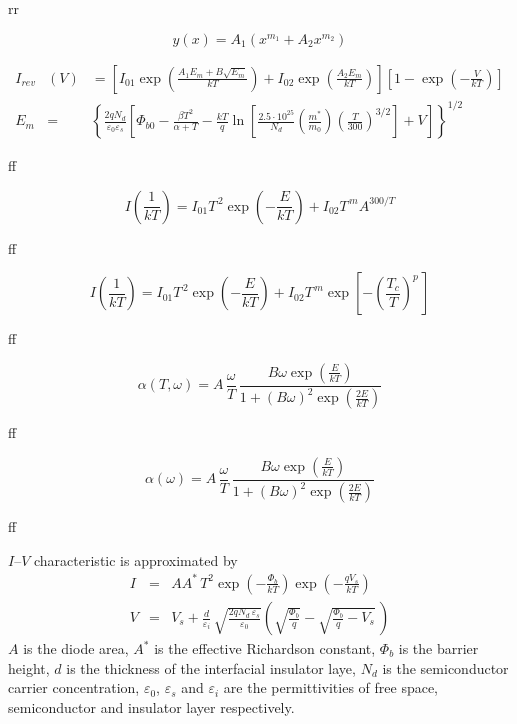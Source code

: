 \documentclass[14pt]{article}
\numberwithin{equation}{part}
\begin{document}
rr


\begin{equation*}
    y(x)=A_1\left(x^{m_1}+A_2x^{m_2}\right)
\end{equation*}

\begin{eqnarray*}
    I_{rev}&(V)&=\left[I_{01}\exp\left(\frac{A_1E_m+B\sqrt{E_m}}{kT}\right)+I_{02}\exp\left(\frac{A_2E_m}{kT}\right)\right]
    \left[1-\exp\left(-\frac{V}{kT}\right)\right] \\
    E_m&=&\left\{\frac{2qN_d}{\varepsilon_0\varepsilon_s}\left[\Phi_{b0}-\frac{\beta T^2}{\alpha+T}-\frac{kT}{q}\ln\left[\frac{2.5\cdot10^{25}}{N_d}\left(\frac{m^*}{m_0}\right)
     \left(\frac{T}{300}\right)^{3/2}\right]+V\right]\right\}^{1/2}
\end{eqnarray*}

ff

\begin{equation*}
    I\left(\frac{1}{kT}\right)=I_{01}T^{\,2}\exp\left(-\frac{E}{kT}\right)+
       I_{02}T^{\,m}A^{300/T}
\end{equation*}

ff

\begin{equation*}
    I\left(\frac{1}{kT}\right)=I_{01}T^{\,2}\exp\left(-\frac{E}{kT}\right)+
       I_{02}T^{\,m}\exp\left[-\left(\frac{T_c}{T}\right)^{\!p}\,\right]
\end{equation*}

ff

\begin{equation*}
    \alpha(T,\omega)=A \,\frac{\omega}{T} \,\frac{B\omega\exp\left(\frac{E}{kT}\right)}{1+(B\omega)^2\exp\left(\frac{2E}{kT}\right)}
\end{equation*}

ff

\begin{equation*}
    \alpha(\omega)=A \,\frac{\omega}{T} \,\frac{B\omega\exp\left(\frac{E}{kT}\right)}{1+(B\omega)^2\exp\left(\frac{2E}{kT}\right)}
\end{equation*}

ff
\pagebreak

$I$--$V$ characteristic is approximated by
\begin{eqnarray*}
I&=&AA^*\,T^2\exp\left(-\frac{\Phi_b}{kT}\right)\exp\left(-\frac{qV_s}{kT}\right)\\
V&=&V_s+\frac{d}{\varepsilon_i}\,\sqrt{\frac{2qN_d\,\varepsilon_s}{\varepsilon_0}}\left(\sqrt{\frac{\Phi_b}{q}}-\sqrt{\frac{\Phi_b}{q}-V_s}\,\right)
\end{eqnarray*}
$A$ is the diode area,
$A^*$ is the effective Richardson constant,
$\Phi_b$ is the barrier height,
$d$ is the thickness of the interfacial insulator laye,
$N_d$ is the semiconductor carrier concentration,
$\varepsilon_0$, $\varepsilon_s$ and $\varepsilon_i$ are the permittivities of free space, semiconductor and insulator layer respectively.
\end{document}
